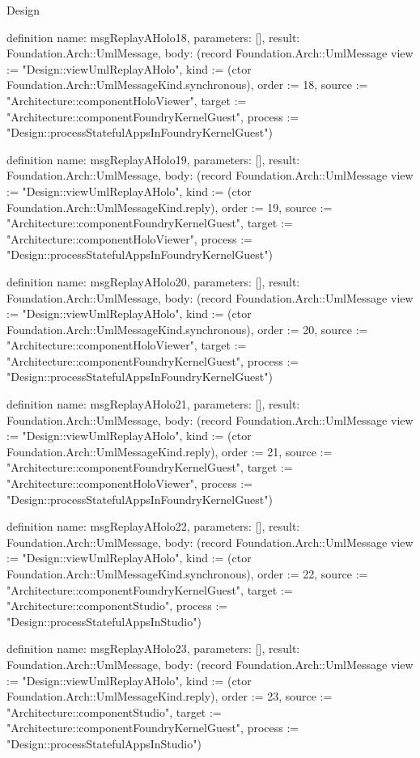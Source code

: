 \begin{lexlean}{Design}
\begin{semanticmodule}
definition{
  name: msgReplayAHolo18,
  parameters: [],
  result: Foundation.Arch::UmlMessage,
  body: (record Foundation.Arch::UmlMessage {view := "Design::viewUmlReplayAHolo", kind := (ctor Foundation.Arch::UmlMessageKind.synchronous), order := 18, source := "Architecture::componentHoloViewer", target := "Architecture::componentFoundryKernelGuest", process := "Design::processStatefulAppsInFoundryKernelGuest"})
}

definition{
  name: msgReplayAHolo19,
  parameters: [],
  result: Foundation.Arch::UmlMessage,
  body: (record Foundation.Arch::UmlMessage {view := "Design::viewUmlReplayAHolo", kind := (ctor Foundation.Arch::UmlMessageKind.reply), order := 19, source := "Architecture::componentFoundryKernelGuest", target := "Architecture::componentHoloViewer", process := "Design::processStatefulAppsInFoundryKernelGuest"})
}

definition{
  name: msgReplayAHolo20,
  parameters: [],
  result: Foundation.Arch::UmlMessage,
  body: (record Foundation.Arch::UmlMessage {view := "Design::viewUmlReplayAHolo", kind := (ctor Foundation.Arch::UmlMessageKind.synchronous), order := 20, source := "Architecture::componentHoloViewer", target := "Architecture::componentFoundryKernelGuest", process := "Design::processStatefulAppsInFoundryKernelGuest"})
}

definition{
  name: msgReplayAHolo21,
  parameters: [],
  result: Foundation.Arch::UmlMessage,
  body: (record Foundation.Arch::UmlMessage {view := "Design::viewUmlReplayAHolo", kind := (ctor Foundation.Arch::UmlMessageKind.reply), order := 21, source := "Architecture::componentFoundryKernelGuest", target := "Architecture::componentHoloViewer", process := "Design::processStatefulAppsInFoundryKernelGuest"})
}

definition{
  name: msgReplayAHolo22,
  parameters: [],
  result: Foundation.Arch::UmlMessage,
  body: (record Foundation.Arch::UmlMessage {view := "Design::viewUmlReplayAHolo", kind := (ctor Foundation.Arch::UmlMessageKind.synchronous), order := 22, source := "Architecture::componentFoundryKernelGuest", target := "Architecture::componentStudio", process := "Design::processStatefulAppsInStudio"})
}

definition{
  name: msgReplayAHolo23,
  parameters: [],
  result: Foundation.Arch::UmlMessage,
  body: (record Foundation.Arch::UmlMessage {view := "Design::viewUmlReplayAHolo", kind := (ctor Foundation.Arch::UmlMessageKind.reply), order := 23, source := "Architecture::componentStudio", target := "Architecture::componentFoundryKernelGuest", process := "Design::processStatefulAppsInStudio"})
}


\end{semanticmodule}
\end{lexlean}
